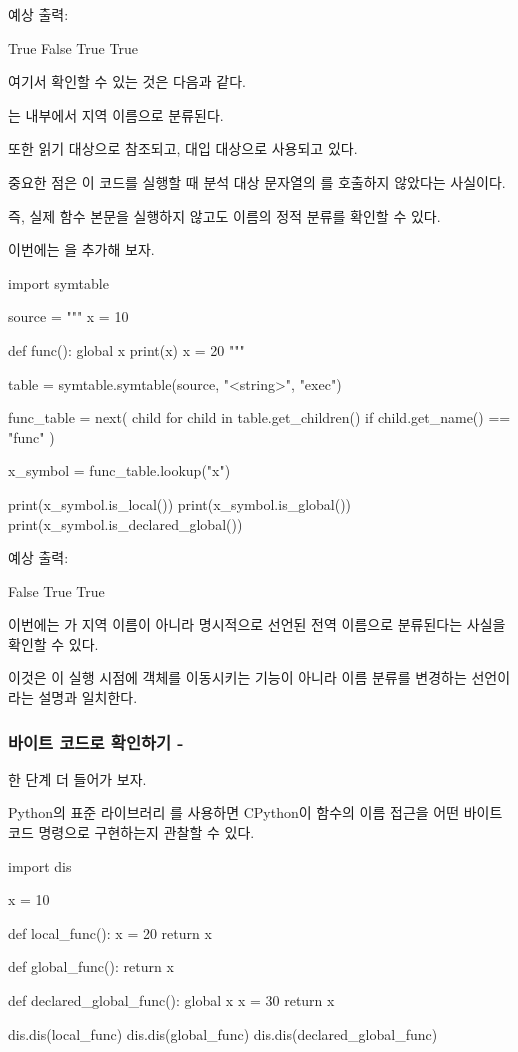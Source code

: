 예상 출력:

\begin{dhkzsh}
True
False
True
True
\end{dhkzsh}

여기서 확인할 수 있는 것은 다음과 같다.

는  내부에서 지역 이름으로 분류된다.

또한 읽기 대상으로 참조되고, 대입 대상으로 사용되고 있다.

중요한 점은 이 코드를 실행할 때 분석 대상 문자열의 를 호출하지 않았다는 사실이다.

즉, 실제 함수 본문을 실행하지 않고도 이름의 정적 분류를 확인할 수 있다.

이번에는 을 추가해 보자.

\begin{dhkcode}
import symtable

source = """
x = 10

def func():
    global x
    print(x)
    x = 20
"""

table = symtable.symtable(source, "<string>", "exec")

func_table = next(
    child
    for child in table.get_children()
    if child.get_name() == "func"
)

x_symbol = func_table.lookup("x")

print(x_symbol.is_local())
print(x_symbol.is_global())
print(x_symbol.is_declared_global())
\end{dhkcode}

예상 출력:

\begin{dhkzsh}
False
True
True
\end{dhkzsh}

이번에는 가 지역 이름이 아니라 명시적으로 선언된 전역 이름으로 분류된다는 사실을 확인할 수 있다.

이것은 이 실행 시점에 객체를 이동시키는 기능이 아니라 이름 분류를 변경하는 선언이라는 설명과 일치한다.

\subsubsection{바이트 코드로 확인하기 - }

한 단계 더 들어가 보자.

Python의 표준 라이브러리 를 사용하면 CPython이 함수의 이름 접근을 어떤 바이트코드 명령으로 구현하는지 관찰할 수 있다.

\begin{dhkcode}
import dis

x = 10

def local_func():
    x = 20
    return x


def global_func():
    return x


def declared_global_func():
    global x
    x = 30
    return x


dis.dis(local_func)
dis.dis(global_func)
dis.dis(declared_global_func)
\end{dhkcode}

